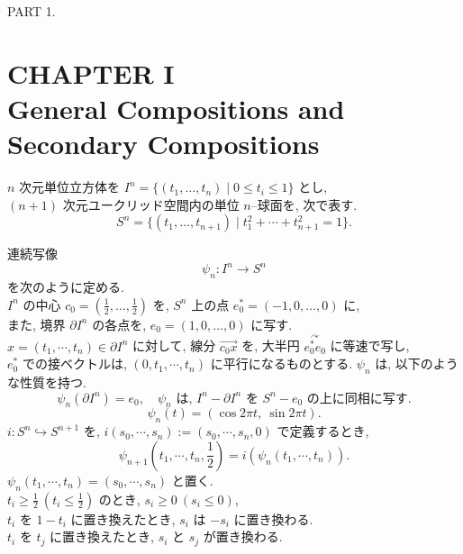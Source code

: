 \documentclass[12pt, leqno]{ltjsarticle}
\numberwithin{equation}{section}
\theoremstyle{plain}
\theoremstyle{definition}
\theoremstyle{remark}
\begin{document}
\begin{center}
  PART 1.
\end{center}

\setcounter{section}{1}

\section*{CHAPTER I\\ General Compositions and Secondary Compositions}

$n$ 次元単位立方体を
\(
I^n=\{(t_1,\ldots,t_n)\mid 0\le t_i\le 1\}
\)
とし, \\
$(n+1)$ 次元ユークリッド空間内の単位 $n$–球面を, 次で表す.
\[
S^n=\{(t_1,\ldots,t_{n+1})\mid t_1^2+\cdots+t_{n+1}^2=1\}.
\]

連続写像
\begin{equation}
\psi_n:I^n\longrightarrow S^n
\end{equation}
を次のように定める. \\
$I^n$ の中心 $c_0=(\tfrac12,\ldots,\tfrac12)$ を,
$S^n$ 上の点 $e_0^*=(-1,0,\ldots,0)$ に, \\
また, 境界 $\partial I^n$ の各点を, 
$e_0=(1,0,\ldots,0)$ に写す.\\
\(x=(t_1,\cdots,t_n)\in\partial I^{n}\)
に対して, 線分
\(\overrightarrow{c_{0}x}\)
を, 大半円
\(\stackrel{\curvearrowright}{e_{0}^{*}e_{0}}\)
に等速で写し,\\
\(e_{0}^{*}\)
での接ベクトルは,
\((0,t_{1},\cdots,t_{n})\)
に平行になるものとする.
\(\psi_n\) は, 以下のような性質を持つ.
\begin{equation}
  \psi_n(\partial I^n) = e_0,\quad
  \psi_n \text{ は, } I^n - \partial I^n \text{ を }
  S^n - e_0 \text{ の上に同相に写す.}
\end{equation}
\[
\psi_n(t) = (\cos 2\pi t,\ \sin 2\pi t).
\]
\(i:S^{n}\hookrightarrow S^{n+1}\)
を,
\(i(s_{0},\cdots,s_{n}) := (s_{0},\cdots,s_{n},0)\)
で定義するとき,
\[
\psi_{n+1}(t_{1},\cdots,t_{n},\frac{1}{2})=
i(\psi_{n}(t_{1},\cdots,t_{n})).
\]
\(\psi_{n}(t_{1},\cdots,t_{n})=(s_{0},\cdots,s_{n})\)
と置く.\\
\(t_{i}\geq\frac{1}{2}\ (t_{i}\leq\frac{1}{2})\)
のとき,
\(s_{i}\geq0\ (s_{i}\leq0)\),\\
\(t_{i}\)
を
\(1-t_{i}\)
に置き換えたとき,
\(s_{i}\)
は
\(-s_{i}\)
に置き換わる.\\
\(t_{i}\)
を
\(t_{j}\)
に置き換えたとき,
\(s_{i}\)
と
\(s_{j}\)
が置き換わる.
\end{document}
